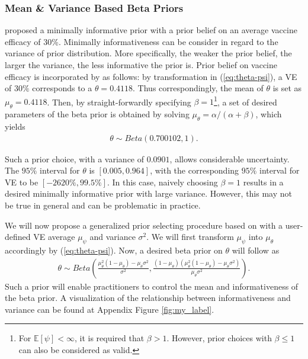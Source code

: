 \documentclass[12pt]{amsart}
\begin{document}
\subsubsection{Mean \& Variance Based Beta Priors}
\label{sec: 212}
\cite{paper} proposed a minimally informative prior with a prior belief on an average vaccine efficacy of 30\%. Minimally informativeness can be consider in regard to the variance of prior distribution. More specifically, the weaker the prior belief, the larger the variance, the less informative the prior is. Prior belief on vaccine efficacy is incorporated by \cite{paper} as follows: by transformation in (\ref{eq:theta-psi}), a VE of $30\%$ corresponds to a $\theta = 0.4118$. Thus correspondingly, the mean of $\theta$ is set as $\mu_\theta = 0.4118$. Then, by straight-forwardly specifying $\beta = 1$\footnote{For $\mathbb{E}[\psi] < \infty$, it is required that $\beta > 1$. However, prior choices with $\beta \leq 1$ can also be considered as valid.}, a set of desired parameters of the beta prior is obtained by solving $\mu_\theta = \alpha / (\alpha + \beta)$, which yields
\begin{align}
    \theta \sim Beta(0.700102, 1).
    \label{pri: paper}
\end{align}

Such a prior choice, with a variance of $0.0901$, allows considerable uncertainty. The $95\%$ interval for $\theta$ is $[0.005, 0.964]$, with the corresponding $95\%$ interval for VE to be $[-2620\%, 99.5\%]$. In this case, naively choosing $\beta = 1$ results in a desired minimally informative prior with large variance. However, this may not be true in general and can be problematic in practice. 

We will now propose a generalized prior selecting procedure based on \cite{paper} with a user-defined VE average $\mu_\psi$ and variance $\sigma^2$. We will first transform $\mu_\psi$ into $\mu_\theta$ accordingly by (\ref{eq:theta-psi}). Now, a desired beta prior on $\theta$ will follow as
\begin{align}
    \theta\sim Beta\left(\frac{\mu_\theta^2 (1 - \mu_\theta) - \mu_\theta \sigma^2}{\sigma^2}, \frac{(1 - \mu_\theta)(\mu_\theta^2 (1 - \mu_\theta) - \mu_\theta \sigma^2)}{\mu_\theta \sigma^2}\right).
    \label{pri: var}
\end{align}
Such a prior will enable practitioners to control the mean and informativeness of the beta prior. A visualization of the relationship between informativeness and variance can be found at Appendix Figure \ref{fig:my_label}.
\end{document}
